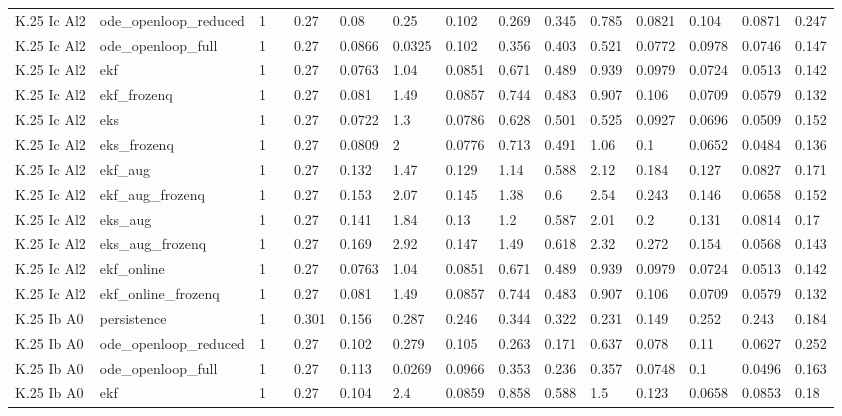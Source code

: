 \begin{table}[t]
\begin{tabular}{lllllllllllllll}
K.25 Ic Al2 & ode\_openloop\_reduced & 1 &  & 0.27 & 0.08 & 0.25 & 0.102 & 0.269 & 0.345 & 0.785 & 0.0821 & 0.104 & 0.0871 & 0.247 \\
K.25 Ic Al2 & ode\_openloop\_full & 1 &  & 0.27 & 0.0866 & 0.0325 & 0.102 & 0.356 & 0.403 & 0.521 & 0.0772 & 0.0978 & 0.0746 & 0.147 \\
K.25 Ic Al2 & ekf & 1 &  & 0.27 & 0.0763 & 1.04 & 0.0851 & 0.671 & 0.489 & 0.939 & 0.0979 & 0.0724 & 0.0513 & 0.142 \\
K.25 Ic Al2 & ekf\_frozenq & 1 &  & 0.27 & 0.081 & 1.49 & 0.0857 & 0.744 & 0.483 & 0.907 & 0.106 & 0.0709 & 0.0579 & 0.132 \\
K.25 Ic Al2 & eks & 1 &  & 0.27 & 0.0722 & 1.3 & 0.0786 & 0.628 & 0.501 & 0.525 & 0.0927 & 0.0696 & 0.0509 & 0.152 \\
K.25 Ic Al2 & eks\_frozenq & 1 &  & 0.27 & 0.0809 & 2 & 0.0776 & 0.713 & 0.491 & 1.06 & 0.1 & 0.0652 & 0.0484 & 0.136 \\
K.25 Ic Al2 & ekf\_aug & 1 &  & 0.27 & 0.132 & 1.47 & 0.129 & 1.14 & 0.588 & 2.12 & 0.184 & 0.127 & 0.0827 & 0.171 \\
K.25 Ic Al2 & ekf\_aug\_frozenq & 1 &  & 0.27 & 0.153 & 2.07 & 0.145 & 1.38 & 0.6 & 2.54 & 0.243 & 0.146 & 0.0658 & 0.152 \\
K.25 Ic Al2 & eks\_aug & 1 &  & 0.27 & 0.141 & 1.84 & 0.13 & 1.2 & 0.587 & 2.01 & 0.2 & 0.131 & 0.0814 & 0.17 \\
K.25 Ic Al2 & eks\_aug\_frozenq & 1 &  & 0.27 & 0.169 & 2.92 & 0.147 & 1.49 & 0.618 & 2.32 & 0.272 & 0.154 & 0.0568 & 0.143 \\
K.25 Ic Al2 & ekf\_online & 1 &  & 0.27 & 0.0763 & 1.04 & 0.0851 & 0.671 & 0.489 & 0.939 & 0.0979 & 0.0724 & 0.0513 & 0.142 \\
K.25 Ic Al2 & ekf\_online\_frozenq & 1 &  & 0.27 & 0.081 & 1.49 & 0.0857 & 0.744 & 0.483 & 0.907 & 0.106 & 0.0709 & 0.0579 & 0.132 \\
K.25 Ib A0 & persistence & 1 &  & 0.301 & 0.156 & 0.287 & 0.246 & 0.344 & 0.322 & 0.231 & 0.149 & 0.252 & 0.243 & 0.184 \\
K.25 Ib A0 & ode\_openloop\_reduced & 1 &  & 0.27 & 0.102 & 0.279 & 0.105 & 0.263 & 0.171 & 0.637 & 0.078 & 0.11 & 0.0627 & 0.252 \\
K.25 Ib A0 & ode\_openloop\_full & 1 &  & 0.27 & 0.113 & 0.0269 & 0.0966 & 0.353 & 0.236 & 0.357 & 0.0748 & 0.1 & 0.0496 & 0.163 \\
K.25 Ib A0 & ekf & 1 &  & 0.27 & 0.104 & 2.4 & 0.0859 & 0.858 & 0.588 & 1.5 & 0.123 & 0.0658 & 0.0853 & 0.18 \\

\end{tabular}
\end{table}
